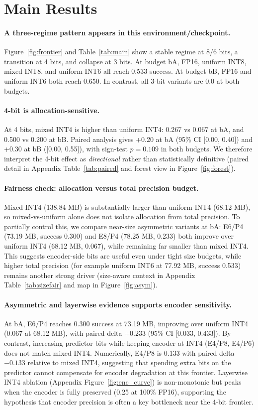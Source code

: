 \documentclass{article}
\begin{document}
\section{Main Results}
\paragraph{A three-regime pattern appears in this environment/checkpoint.}
Figure~\ref{fig:frontier} and Table~\ref{tab:main} show a stable regime at 8/6 bits, a transition at 4 bits, and collapse at 3 bits.
At budget bA, FP16, uniform INT8, mixed INT8, and uniform INT6 all reach 0.533 success.
At budget bB, FP16 and uniform INT6 both reach 0.650.
In contrast, all 3-bit variants are 0.0 at both budgets.

\paragraph{4-bit is allocation-sensitive.}
At 4 bits, mixed INT4 is higher than uniform INT4: 0.267 vs 0.067 at bA, and 0.500 vs 0.200 at bB.
Paired analysis gives +0.20 at bA (95\% CI [0.00, 0.40]) and +0.30 at bB ([0.00, 0.55]), with sign-test $p=0.109$ in both budgets.
We therefore interpret the 4-bit effect as \emph{directional} rather than statistically definitive (paired detail in Appendix Table~\ref{tab:paired} and forest view in Figure~\ref{fig:forest}).

\paragraph{Fairness check: allocation versus total precision budget.}
Mixed INT4 (138.84 MB) is substantially larger than uniform INT4 (68.12 MB), so mixed-vs-uniform alone does not isolate allocation from total precision.
To partially control this, we compare near-size asymmetric variants at bA: E6/P4 (73.19 MB, success 0.300) and E8/P4 (78.25 MB, 0.233) both improve over uniform INT4 (68.12 MB, 0.067), while remaining far smaller than mixed INT4.
This suggests encoder-side bits are useful even under tight size budgets, while higher total precision (for example uniform INT6 at 77.92 MB, success 0.533) remains another strong driver (size-aware context in Appendix Table~\ref{tab:sizefair} and map in Figure~\ref{fig:asym}).

\paragraph{Asymmetric and layerwise evidence supports encoder sensitivity.}
At bA, E6/P4 reaches 0.300 success at 73.19 MB, improving over uniform INT4 (0.067 at 68.12 MB), with paired delta +0.233 (95\% CI [0.033, 0.433]).
By contrast, increasing predictor bits while keeping encoder at INT4 (E4/P8, E4/P6) does not match mixed INT4.
Numerically, E4/P8 is 0.133 with paired delta $-0.133$ relative to mixed INT4, suggesting that spending extra bits on the predictor cannot compensate for encoder degradation at this frontier.
Layerwise INT4 ablation (Appendix Figure~\ref{fig:enc_curve}) is non-monotonic but peaks when the encoder is fully preserved (0.25 at 100\% FP16), supporting the hypothesis that encoder precision is often a key bottleneck near the 4-bit frontier.
\end{document}
